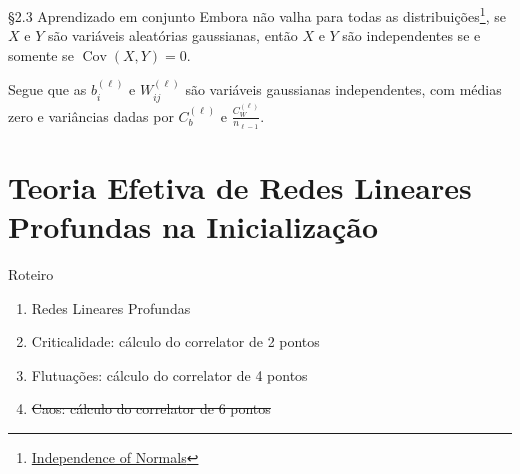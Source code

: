 \documentclass{beamer}
\DeclareMathOperator{\Cov}{Cov}
\def\eell{{(\ell)}}
\begin{document}
\begin{frame}{\S 2.3 Aprendizado em conjunto}
	Embora não valha para todas as distribuições\footnote{\href{https://almostsuremath.com/2021/03/24/independence-of-normals/}{Independence of Normals}}, se $X$ e $Y$ são variáveis aleatórias gaussianas, então $X$ e $Y$ são independentes se e somente se $\Cov(X,Y) = 0$.  

	\medskip

	Segue que as $b^\eell_i$ e $W^\eell_{ij}$ são variáveis gaussianas independentes, com médias zero e variâncias dadas por $C_b^\eell$ e $\frac{C_W^\eell}{n_{\ell-1}}$.
\end{frame}

\section{Teoria Efetiva de Redes Lineares Profundas na Inicialização}

\begin{frame}
	\tableofcontents[currentsection]
\end{frame}

\begin{frame}{Roteiro}
	\begin{enumerate}[\S 3.1]
		\item Redes Lineares Profundas
		\item Criticalidade: cálculo do correlator de 2 pontos
		\item Flutuações: cálculo do correlator de 4 pontos
		\item \sout{Caos: cálculo do correlator de 6 pontos}
	\end{enumerate}
	
\end{frame}
\end{document}
